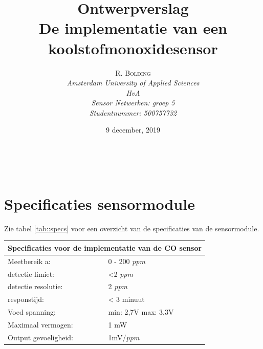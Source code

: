 \documentclass[a4paper, 11pt]{article} %
\title{\textbf{Ontwerpverslag}\\ %
	De implementatie van een koolstofmonoxidesensor} %
\author{\textsc{R. Bolding} %
	\\{\textit{Amsterdam University of Applied Sciences\\ 
			HvA\\
			Sensor Netwerken: groep 5\\
			Studentnummer: 500757732}}} %
\date{9 december, 2019} %
\makeatletter
\renewcommand{\maketitle}{ %
	\begin{flushright} %
		{\LARGE\@title} %
		
		\vspace{50pt} %
		
		{\large\@author} %
		\\\@date %
		
		\vspace{40pt} %
	\end{flushright}
}
\makeatother
\begin{document}
	\captionsetup{justification=centering}
	\renewcommand{\contentsname}{Inhoudsopgave}
	\def\textsubscript#1{\ensuremath{_{\mbox{\textscale{.6}{#1}}}}}
	\hypersetup{hidelinks=true}
	\maketitle %
	
	
	
	
	\vspace{10pt} %
	
	\newpage
	\tableofcontents
	\newpage
	\section{Specificaties sensormodule} \label{sec::specificaties}
	Zie tabel \ref{tab::specs} voor een overzicht van de specificaties van de sensormodule.
	\begin{center}
		\begin{tabular}{ | m{5cm} | m{5cm}| } 
			\hline
			\multicolumn{2}{|c|}{Specificaties voor de implementatie van de CO sensor} \\
			\hline
			Meetbereik a: & 0 - 200 \textit{ppm} \\
			\hline
			detectie limiet:  & <2 \textit{ppm}
			\\ 
			\hline
			detectie resolutie: & 2 \textit{ppm} 
			\\ 
			\hline
			responstijd: & < 3 minuut
			\\ 
			\hline
			Voed spanning: & min: 2,7V max: 3,3V
			\\ 
			\hline
			Maximaal vermogen: & 1 mW
			\\
			\hline
			Output gevoeligheid: & 1mV/\textit{ppm}
			\\
			\hline
		\end{tabular}\label{tab::specs}
	\end{center}
\end{document}
